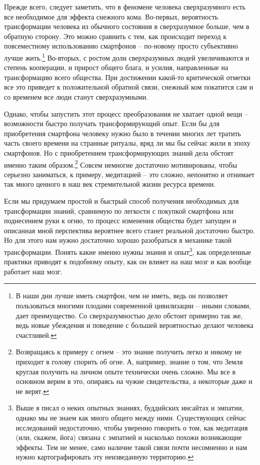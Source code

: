 \documentclass[12pt,a4paper]{report}
\begin{document}
\noindent Прежде всего, следует заметить, что в феномене человека сверхразумного есть все необходимое для эффекта снежного кома. Во-первых, вероятность трансформации человека из обычного состояния в сверхразумное больше, чем в обратную сторону. Это можно сравнить с тем, как происходит переход к повсеместному использованию смартфонов -- по-новому просто субъективно лучше жить.\footnote{В наши дни лучше иметь смартфон, чем не иметь, ведь он позволяет пользоваться многими плодами современной цивилизации – иными словами, дает преимущество. Со сверхразумностью дело обстоит примерно так же, ведь новые убеждения и поведение с большей вероятностью делают человека счастливей.} Во-вторых, с ростом доли сверхразумных людей увеличиваются и степень кооперации, и прирост общего блага, и усилия, направленные на трансформацию всего общества. При достижении какой-то критической отметки все это приведет к положительной обратной связи, снежный ком покатится сам и со временем все люди станут сверхразумными.

\noindent Однако, чтобы запустить этот процесс преобразования не хватает одной вещи -- возможности быстро получать трансформирующий опыт. Если бы для приобретения смартфона человеку нужно было в течении многих лет тратить часть своего времени на странные ритуалы, вряд ли мы бы сейчас жили в эпоху смартфонов. Но с приобретением трансформирующих знаний дела обстоят именно таким образом.\footnote{Возвращаясь к примеру с огнем -- это знание получить легко и никому не приходит в голову спорить об огне. А, например, знание о том, что Земля круглая получить на личном опыте технически очень сложно. Мы все в основном верим в это, опираясь на чужие свидетельства, а некоторые даже и не верят.} Совсем немногие достаточно мотивированы, чтобы серьезно заниматься, к примеру, медитацией -- это сложно, непонятно и отнимает так много ценного в наш век стремительной жизни ресурса времени.

\noindent Если мы придумаем простой и быстрый способ получения необходимых для трансформации знаний, сравнимую по легкости с покупкой смартфона или поднесением руки к огню, то процесс изменения общества будет запущен и описанная мной перспектива вероятнее всего станет реальной достаточно быстро. Но для этого нам нужно достаточно хорошо разобраться в механике такой трансформации. Понять какие именно нужны знания и опыт\footnote{Выше я писал о неких опытных знаниях, буддийских инсайтах и эмпатии, однако мы не знаем как много общего между ними. Существующих сейчас исследований недостаточно, чтобы уверенно говорить о том, как медитация (или, скажем, йога) связана с эмпатией и насколько похожи возникающие эффекты. Тем не менее, само наличие такой связи почти несомненно и нам нужно картографировать эту неизведанную территорию.}, как определенные практики приводят к подобному опыту, как он влияет на наш мозг и как вообще работает наш мозг.
\end{document}
